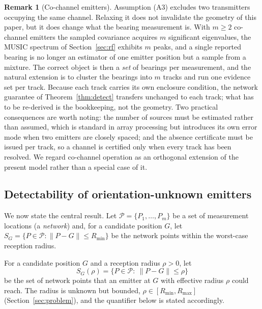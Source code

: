 \documentclass[journal,10pt]{IEEEtran}
\theoremstyle{definition}
\newtheorem{remark}[theorem]{Remark}
\newcommand{\Rmin}{R_{\min}}
\newcommand{\Rmax}{R_{\max}}
\newcommand{\bP}{\mathcal{P}}
\begin{document}
\begin{remark}[Co-channel emitters]
\label{rem:cochannel}
Assumption (A3) excludes two transmitters occupying the same channel. Relaxing it does not
invalidate the geometry of this paper, but it does change what the bearing measurement is.
With $m\ge2$ co-channel emitters the sampled covariance acquires $m$ significant eigenvalues, the
MUSIC spectrum of Section~\ref{sec:rf} exhibits $m$ peaks, and a single reported bearing is no
longer an estimator of one emitter position but a sample from a mixture. The correct object is
then a \emph{set} of bearings per measurement, and the natural extension is to cluster the
bearings into $m$ tracks and run one evidence set per track. Because each track carries its own
enclosure condition, the network guarantee of Theorem~\ref{thm:detect} transfers unchanged to
each track; what has to be re-derived is the bookkeeping, not the geometry. Two practical
consequences are worth noting: the number of sources must be estimated rather than assumed, which
is standard in array processing but introduces its own error mode when two emitters are closely
spaced; and the absence certificate must be issued per track, so a channel is certified only when
every track has been resolved. We regard co-channel operation as an orthogonal extension of the
present model rather than a special case of it.
\end{remark}

\subsection{Detectability of orientation-unknown emitters}
\label{sec:detect}

We now state the central result. Let $\bP=\{P_1,\dots,P_m\}$ be a set of measurement locations
(a \emph{network}) and, for a candidate position $G$, let
$S_G=\{P\in\bP:\|P-G\|\le\Rmin\}$ be the network points within the worst-case reception radius.

For a candidate position $G$ and a reception radius $\rho>0$, let
\begin{equation}
S_G(\rho)=\{P\in\bP:\ \|P-G\|\le\rho\}
\label{eq:SGrho}
\end{equation}
be the set of network points that an emitter at $G$ with effective radius $\rho$ could reach. The
radius is unknown but bounded, $\rho\in[\Rmin,\Rmax]$ (Section~\ref{sec:problem}), and the
quantifier below is stated accordingly.
\end{document}
